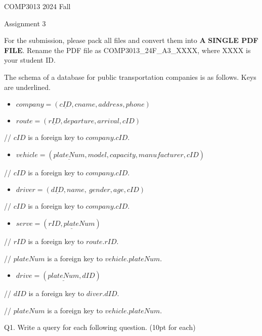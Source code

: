 \documentclass[
]{article}
\author{}
\date{}
\begin{document}
COMP3013 2024 Fall

Assignment 3

For the submission, please pack all files and convert them into
\textbf{A} \textbf{SINGLE PDF FILE}. Rename the PDF file as
COMP3013\_24F\_A3\_XXXX, where XXXX is your student ID.

The schema of a database for public transportation companies is as
follows. Keys are underlined.

\begin{itemize}
\item
  \(company = (\underline{cID},cname,address,phone)\)
\item
  \(route = (\underline{rID},departure,arrival,cID)\)
\end{itemize}

// \(cID\) is a foreign key to \(company.cID\).

\begin{itemize}
\item
  \(vehicle = (\underline{plateNum},model,capacity,manufacturer,cID)\)
\end{itemize}

// \(cID\) is a foreign key to \(company.cID\).

\begin{itemize}
\item
  \(driver = (\underline{dID},name,\ gender,age,cID)\)
\end{itemize}

// \(cID\) is a foreign key to \(company.cID\).

\begin{itemize}
\item
  \(serve = (\underline{rID,plateNum})\)
\end{itemize}

// \(rID\) is a foreign key to \(route.rID\).

// \(plateNum\) is a foreign key to \(vehicle.plateNum\).

\begin{itemize}
\item
  \(drive = (\underline{plateNum},dID)\)
\end{itemize}

// \(dID\) is a foreign key to \(diver.dID\).

// \(plateNum\) is a foreign key to \(vehicle.plateNum\).

Q1. Write a query for each following question. (10pt for each)
\end{document}
